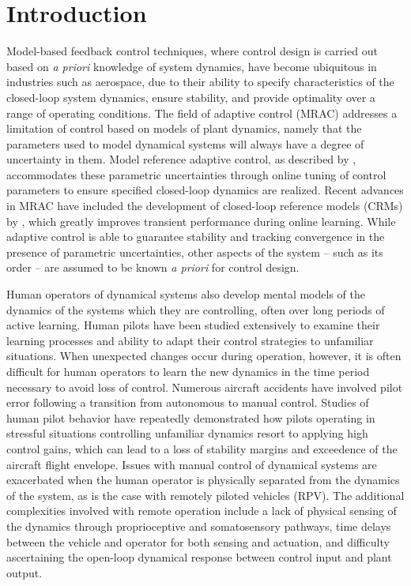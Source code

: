 \documentclass[english]{ifacconf}
\begin{document}
\section{Introduction}
Model-based feedback control techniques, where control design is carried out based on \textit{a priori} knowledge of system dynamics, have become ubiquitous in industries such as aerospace, due to their ability to specify characteristics of the closed-loop system dynamics, ensure stability, and provide optimality over a range of operating conditions. The field of adaptive control (MRAC) addresses a limitation of control based on models of plant dynamics, namely that the parameters used to model dynamical systems will always have a degree of uncertainty in them. Model reference adaptive control, as described by \cite{narendra2012stable}, accommodates these parametric uncertainties through online tuning of control parameters to ensure specified closed-loop dynamics are realized. Recent advances in MRAC have included the development of closed-loop reference models (CRMs) by \cite{gibson2013adaptive}, which greatly improves transient performance during online learning. While adaptive control is able to guarantee stability and tracking convergence in the presence of parametric uncertainties, other aspects of the system -- such as its order -- are assumed to be known \textit{a priori} for control design. 

Human operators of dynamical systems also develop mental models of the dynamics of the systems which they are controlling, often over long periods of active learning. Human pilots have been studied extensively to examine their learning processes and ability to adapt their control strategies to unfamiliar situations. When unexpected changes occur during operation, however, it is often difficult for human operators to learn the new dynamics in the time period necessary to avoid loss of control. Numerous aircraft accidents have involved pilot error following a transition from autonomous to manual control. Studies of human pilot behavior have repeatedly demonstrated how pilots operating in stressful situations controlling unfamiliar dynamics resort to applying high control gains, which can lead to a loss of stability margins and exceedence of the aircraft flight envelope. Issues with manual control of dynamical systems are exacerbated when the human operator is physically separated from the dynamics of the system, as is the case with remotely piloted vehicles (RPV). The additional complexities involved with remote operation include a lack of physical sensing of the dynamics through proprioceptive and somatosensory pathways, time delays between the vehicle and operator for both sensing and actuation, and difficulty ascertaining the open-loop dynamical response between control input and plant output. 
\end{document}
